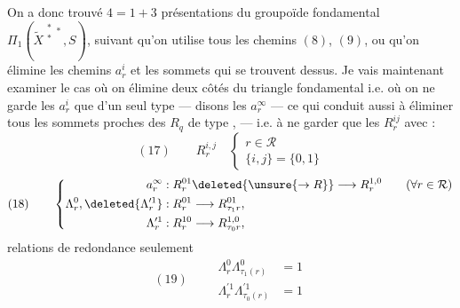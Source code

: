 On a donc trouvé $4=1+3$ présentations du groupoïde fondamental $\Pi_1(\widetilde{X}^{\substack{*\\*}*},S)$, suivant qu'on utilise tous les chemins $(8)$, $(9)$, ou qu'on élimine les chemins $a_r^i$  et les sommets qui se trouvent dessus. Je vais maintenant examiner le cas où on élimine \unsure{=} deux côtés du triangle fondamental i.e. où on ne garde les $a_r^i$ que d'un seul type --- disons les $a_r^\infty$ --- ce qui conduit aussi à éliminer tous les sommets proches des $R_q$  de type  ,   --- i.e.  à ne garder que les $R_r^{ij}$ avec    :
\[
(17)\qquad R_r^{i,j}\quad\left\{\begin{array}{l}
r\in\mathcal{R}\\
\{i,j\}=\{0,1\}
\end{array}\right.
\]
\[
(18)\qquad\left\{\begin{aligned}
a_r^\infty &: R_r^{01}\deleted{\unsure{\to R}}\longrightarrow R_r^{1,0} \qquad(\forall r\in\mathcal{R})\\
\Lambda_r^0,\deleted{\Lambda_r^{\prime1}} &:R_r^{01}\longrightarrow R_{\tau_1r}^{01},\\
\Lambda_r^{\prime1} &:R_r^{10}\longrightarrow R_{\tau_0r}^{1,0},
\end{aligned}\right.
\]
 relations de redondance seulement
\[
(19)\qquad\boxed{\begin{aligned}
\Lambda_r^0\Lambda_{\tau_1(r)}^0&=1\\
\Lambda_r^{\prime1}\Lambda_{\tau_0(r)}^{\prime1}&=1
\end{aligned}}
\]
